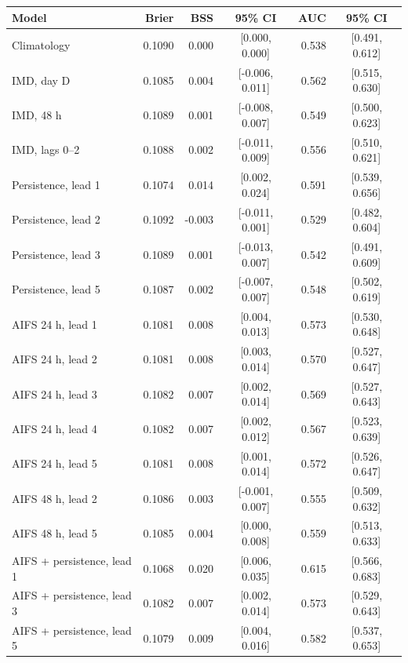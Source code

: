 \begin{tabular}{lrrcrc}\toprule
Model & Brier & BSS & 95\% CI & AUC & 95\% CI \\ \midrule
Climatology & 0.1090 & 0.000 & [0.000, 0.000] & 0.538 & [0.491, 0.612] \\
IMD, day D & 0.1085 & 0.004 & [-0.006, 0.011] & 0.562 & [0.515, 0.630] \\
IMD, 48 h & 0.1089 & 0.001 & [-0.008, 0.007] & 0.549 & [0.500, 0.623] \\
IMD, lags 0--2 & 0.1088 & 0.002 & [-0.011, 0.009] & 0.556 & [0.510, 0.621] \\
\midrule
Persistence, lead 1 & 0.1074 & 0.014 & [0.002, 0.024] & 0.591 & [0.539, 0.656] \\
Persistence, lead 2 & 0.1092 & -0.003 & [-0.011, 0.001] & 0.529 & [0.482, 0.604] \\
Persistence, lead 3 & 0.1089 & 0.001 & [-0.013, 0.007] & 0.542 & [0.491, 0.609] \\
Persistence, lead 5 & 0.1087 & 0.002 & [-0.007, 0.007] & 0.548 & [0.502, 0.619] \\
\midrule
AIFS 24 h, lead 1 & 0.1081 & 0.008 & [0.004, 0.013] & 0.573 & [0.530, 0.648] \\
AIFS 24 h, lead 2 & 0.1081 & 0.008 & [0.003, 0.014] & 0.570 & [0.527, 0.647] \\
AIFS 24 h, lead 3 & 0.1082 & 0.007 & [0.002, 0.014] & 0.569 & [0.527, 0.643] \\
AIFS 24 h, lead 4 & 0.1082 & 0.007 & [0.002, 0.012] & 0.567 & [0.523, 0.639] \\
AIFS 24 h, lead 5 & 0.1081 & 0.008 & [0.001, 0.014] & 0.572 & [0.526, 0.647] \\
\midrule
AIFS 48 h, lead 2 & 0.1086 & 0.003 & [-0.001, 0.007] & 0.555 & [0.509, 0.632] \\
AIFS 48 h, lead 5 & 0.1085 & 0.004 & [0.000, 0.008] & 0.559 & [0.513, 0.633] \\
\midrule
AIFS + persistence, lead 1 & 0.1068 & 0.020 & [0.006, 0.035] & 0.615 & [0.566, 0.683] \\
AIFS + persistence, lead 3 & 0.1082 & 0.007 & [0.002, 0.014] & 0.573 & [0.529, 0.643] \\
AIFS + persistence, lead 5 & 0.1079 & 0.009 & [0.004, 0.016] & 0.582 & [0.537, 0.653] \\
\bottomrule\end{tabular}